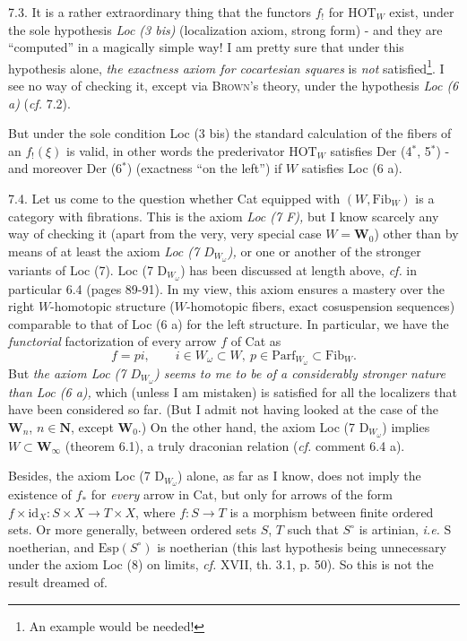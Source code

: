 \documentclass[11pt]{article}
\newcommand{\printedpage}[1]{\marginpar{\footnotesize p.~#1}}
\newcommand{\msp}[1]{\marginpar{\footnotesize [#1]}}
\begin{document}
7.3. It is a rather extraordinary thing that the functors $f_!$ for $\mathrm{HOT}_W$ exist, under the sole hypothesis \textit{Loc (3 bis)} (localization axiom, strong form) - and they are ``computed'' in a magically simple way! I am pretty sure that under this hypothesis alone, \textit{the exactness axiom for cocartesian squares} is \textit{not} satisfied\footnote[47]{An example would be needed!}. I see no way of checking it, except via \textsc{Brown}'s theory, under the hypothesis \textit{Loc (6 a)} (\textit{cf.} 7.2).

But under the sole condition Loc (3 bis) the standard calculation of the fibers of an $f_!(\xi)$
\printedpage{50}
\msp{page 101}
is valid, in other words the prederivator $\mathrm{HOT}_W$ satisfies Der (4$^*$, 5$^*$) - and moreover Der (6$^*$) (exactness ``on the left'') if $W$ satisfies Loc (6 a). %

7.4. Let us come to the question whether Cat equipped with $(W,\mathrm{Fib}_W)$ is a category with fibrations. This is the axiom \textit{Loc (7 F),} but I know scarcely any way of checking it (apart from the very, very special case $W = \mathbf{W}_0$) other than by means of at least the axiom \textit{Loc (7 $D_{W_\omega}$),} or one or another of the stronger variants of Loc (7). Loc (7 $\mathrm{D}_{W_\omega}$) has been discussed at length above, \textit{cf.} in particular 6.4 (pages 89-91). In my view, this axiom ensures a mastery over the right $W$-homotopic structure ($W$-homotopic fibers, exact cosuspension sequences) comparable to that of Loc (6 a) for the
\msp{page 102}
left structure. In particular, we have the \textit{functorial} factorization of every arrow $f$ of Cat as
\[
f = pi, \qquad i \in W_\omega \subset W,\ p \in \mathrm{Parf}_{W_\omega} \subset \mathrm{Fib}_W .
\]
But \textit{the axiom Loc (7 $D_{W_\omega}$) seems to me to be of a considerably stronger nature than Loc (6 a),} which (unless I am mistaken) is satisfied for all the localizers that have been considered so far. (But I admit not having looked at the case of the $\mathbf{W}_n$, $n \in \mathbf{N}$, except $\mathbf{W}_0$.) On the other hand, the axiom Loc (7 $\mathrm{D}_{W_\omega}$) implies $W \subset \mathbf{W}_\infty$ (theorem 6.1), a truly draconian relation (\textit{cf.} comment 6.4 a).

Besides, the axiom Loc (7 $\mathrm{D}_{W_\omega}$) alone, as far as I know, does not imply the existence of $f_*$ for \textit{every} arrow in Cat, but only for
\msp{page 103}
arrows of the form $f \times \mathrm{id}_X : S \times X \longrightarrow T \times X$, where $f : S \longrightarrow T$ is a morphism between finite ordered sets. Or more generally, between ordered sets $S$, $T$ such that $S^\circ$ is artinian, \textit{i.e.} $\mathrm{S}$ noetherian, and $\mathrm{Esp}(S^\circ)$ is noetherian (this last hypothesis being unnecessary under the axiom Loc (8) on limits, \textit{cf.} XVII, th. 3.1, p. 50). So this is not the result dreamed of.
\end{document}
